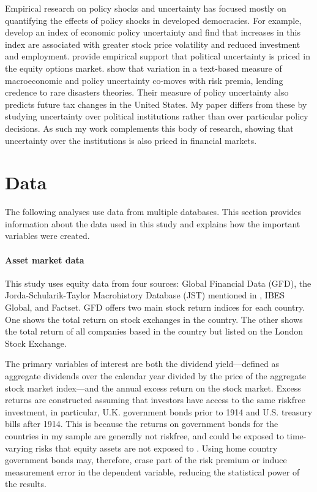 \documentclass[12pt]{article}
\numberwithin{equation}{section}
\begin{document}
Empirical research on policy shocks and uncertainty has focused mostly on quantifying the effects of policy shocks in developed democracies. For example,  \cite*{Baker2016} develop an index of economic policy uncertainty and find that increases in this index are associated with greater stock price volatility and reduced investment and employment.  \cite*{Kelly2016} provide empirical support that political uncertainty is priced in the equity options market.  \cite*{Manela2017} show that variation in a text-based measure of macroeconomic and policy uncertainty co-moves with risk premia, lending credence to rare disasters theories.  Their measure of policy uncertainty also predicts future tax changes in the United States.
My paper differs from these by studying uncertainty over political institutions rather than over particular policy decisions. As such my work complements this body of research, showing that uncertainty over the institutions is also priced in financial markets.



\section{Data}\label{section:data}

The following analyses use data from multiple databases. This section provides information about the data used in this study and explains how the important variables were created.

\paragraph{Asset market data}

This study uses equity data from four sources: Global Financial Data (GFD), the Jorda-Schularik-Taylor Macrohistory Database (JST) mentioned in \citet*{Jorda2020}, IBES Global, and Factset. GFD offers two main stock return indices for each country. One shows the total return on stock exchanges in the country. The other shows the total return of all companies based in the country but listed on the London Stock Exchange.  

The primary variables of interest are both the dividend yield---defined as aggregate dividends over the calendar year divided by the price of the aggregate stock market index---and the annual excess return on the stock market. Excess returns are constructed assuming that investors have access to the same riskfree investment, in particular,  U.K. government bonds prior to 1914 and U.S. treasury bills after 1914.  This is because the returns on government bonds for the countries in my sample are generally not riskfree, and could be exposed to time-varying risks that equity assets are not exposed to \citep*{Miller2020}. Using home country government bonds may, therefore, erase part of the risk premium or induce measurement error in the dependent variable, reducing the statistical power of the results.
\end{document}
